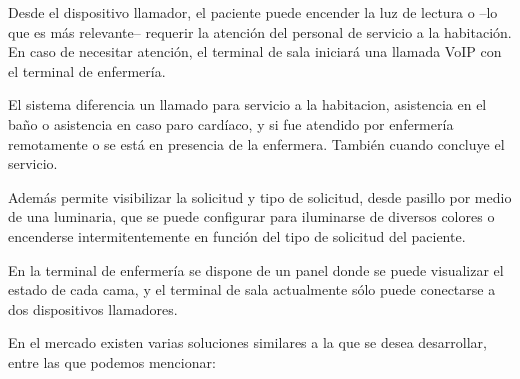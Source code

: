 Desde el dispositivo llamador, el paciente puede encender la luz de lectura o –lo que es más relevante– requerir la atención del personal de servicio a la habitación. En caso de necesitar atención, el terminal de sala iniciará una llamada VoIP con el terminal de enfermería.

El sistema diferencia un llamado para servicio a la habitacion, asistencia en el baño o asistencia en caso paro cardíaco, y si fue atendido por enfermería remotamente o se está en presencia de la enfermera. También cuando concluye el servicio.

Además permite visibilizar la solicitud y tipo de solicitud, desde pasillo por medio de una luminaria, que se puede configurar para iluminarse de diversos colores o encenderse intermitentemente en función del tipo de solicitud del paciente.

En la terminal de enfermería se dispone de un panel donde se puede visualizar el estado de cada cama, y el terminal de sala actualmente sólo puede conectarse a dos dispositivos llamadores.

En el mercado existen varias soluciones similares a la que se desea desarrollar, entre las que podemos mencionar:

